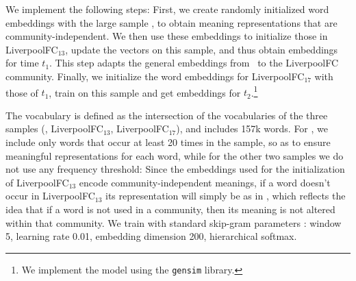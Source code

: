 We implement the following steps:
First, we create  randomly initialized word embeddings with the large sample \redd, to obtain meaning
representations that are community-independent.
We then use these embeddings
to initialize those in LiverpoolFC$_{13}$, update the vectors on this
sample, and thus obtain embeddings for time $t_1$. This step
adapts the general embeddings from \redd\  to the
LiverpoolFC community. Finally, we
initialize the word embeddings for LiverpoolFC$_{17}$ with those of $t_1$, train on this sample and get embeddings for $t_2$.\footnote{We implement the model
using the \texttt{gensim} library.}   


The vocabulary is defined as the intersection of the
vocabularies of the three samples (\redd, LiverpoolFC$_{13}$,
LiverpoolFC$_{17}$), and includes 157k words.
For \redd, we include only words that occur at least 20 times in the
sample, so as to ensure meaningful representations for each word,
while for the other two samples we do not use any frequency
threshold: Since the embeddings used for the initialization of
LiverpoolFC$_{13}$ encode community-independent meanings, if a word doesn't occur in
LiverpoolFC$_{13}$ its representation will simply be as in \redd,
which reflects the idea that if a word is not used in a community, then its meaning is not altered within
that community. 
We train with standard skip-gram parameters \cite{levy2015improving}: window 5, learning rate 0.01, embedding dimension 200, hierarchical softmax.




